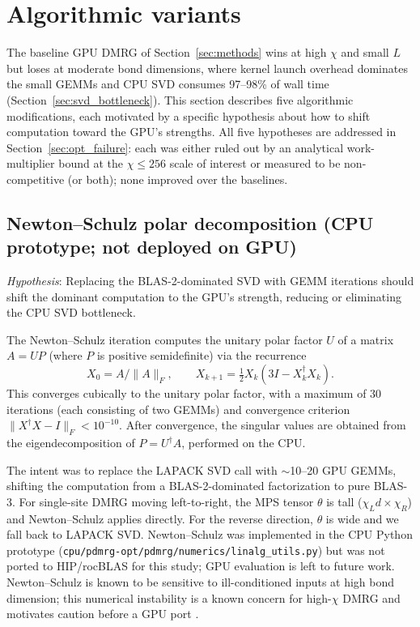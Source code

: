 \documentclass[preprint,12pt]{elsarticle}
\begin{document}
\section{Algorithmic variants}
\label{sec:variants}

The baseline GPU DMRG of Section~\ref{sec:methods} wins at high $\chi$ and small $L$ but loses at moderate bond dimensions, where kernel launch overhead dominates the small GEMMs and CPU SVD consumes 97--98\% of wall time (Section~\ref{sec:svd_bottleneck}).
This section describes five algorithmic modifications, each motivated by a specific hypothesis about how to shift computation toward the GPU's strengths.
All five hypotheses are addressed in Section~\ref{sec:opt_failure}: each was either ruled out by an analytical work-multiplier bound at the $\chi \le 256$ scale of interest or measured to be non-competitive (or both); none improved over the baselines.

\subsection{Newton--Schulz polar decomposition (CPU prototype; not deployed on GPU)}
\label{sec:newton_schulz}

\emph{Hypothesis}: Replacing the BLAS-2-dominated SVD with GEMM iterations should shift the dominant computation to the GPU's strength, reducing or eliminating the CPU SVD bottleneck.

The Newton--Schulz iteration computes the unitary polar factor $U$ of a matrix $A = UP$ (where $P$ is positive semidefinite) via the recurrence \cite{Schulz1933,Nakamura2020}
\begin{equation}
  X_0 = A / \|A\|_F, \qquad X_{k+1} = \tfrac{1}{2} X_k (3I - X_k^\dagger X_k).
  \label{eq:newton_schulz}
\end{equation}
This converges cubically to the unitary polar factor, with a maximum of 30 iterations (each consisting of two GEMMs) and convergence criterion $\|X^\dagger X - I\|_F < 10^{-10}$.
After convergence, the singular values are obtained from the eigendecomposition of $P = U^\dagger A$, performed on the CPU.

The intent was to replace the LAPACK SVD call with $\sim$10--20 GPU GEMMs, shifting the computation from a BLAS-2-dominated factorization to pure BLAS-3.
For single-site DMRG moving left-to-right, the MPS tensor $\theta$ is tall ($\chi_L d \times \chi_R$) and Newton--Schulz applies directly.
For the reverse direction, $\theta$ is wide and we fall back to LAPACK SVD.
Newton--Schulz was implemented in the CPU Python prototype (\texttt{cpu/pdmrg-opt/pdmrg/numerics/linalg\_utils.py}) but was not ported to HIP/rocBLAS for this study; GPU evaluation is left to future work.
Newton--Schulz is known to be sensitive to ill-conditioned inputs at high bond dimension; this numerical instability is a known concern for high-$\chi$ DMRG and motivates caution before a GPU port \cite{Schulz1933,Nakamura2020}.
\end{document}
